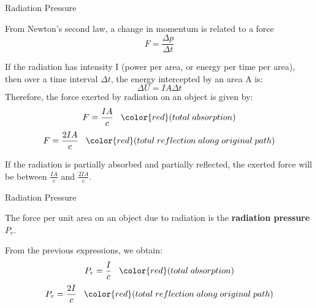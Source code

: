 %
%
%
%

\begin{frame}{Radiation Pressure}

From Newton's second law, a change in momentum is related to a force
\begin{equation*}
   F = \frac{{\Delta}p}{{\Delta}t}
\end{equation*}

If the radiation has intensity I (power per area, or energy per time
per area), then over a time interval ${\Delta}t$, the energy
intercepted by an area A is:
\begin{equation*}
  {\Delta}U = I A {\Delta}t
\end{equation*}
Therefore, the force exerted by radiation on an object is given by:
\begin{equation*}
  F = \frac{IA}{c}
  \;\;\; {\color{red} (total \; absorption)}
\end{equation*}
\begin{equation*}
  F = \frac{2IA}{c}
  \;\;\; {\color{red} (total \; reflection \; along \; original \; path)}
\end{equation*}

If the radiation is partially absorbed and partially reflected, the
exerted force will be between $\frac{IA}{c}$
and $\frac{2IA}{c}$.

\end{frame}

%
%
%
%

\begin{frame}{Radiation Pressure}

The force per unit area on an object due to radiation is the {\bf radiation
pressure} $P_{r}$.\\
\vspace{0.2cm}

From the previous expressions, we obtain:
\begin{equation*}
  P_r = \frac{I}{c}
  \;\;\; {\color{red} (total \; absorption)}
\end{equation*}
\begin{equation*}
  P_r = \frac{2I}{c}
  \;\;\; {\color{red} (total \; reflection \; along \; original \; path)}
\end{equation*}


\end{frame}

%
%
%
%

